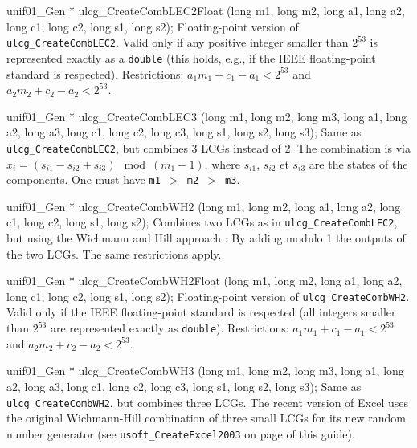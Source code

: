 unif01_Gen * ulcg_CreateCombLEC2Float (long m1, long m2, long a1, long a2,
                                       long c1, long c2, long s1, long s2);
\endcode
  \tab  Floating-point version of {\tt ulcg\_CreateCombLEC2}.
   Valid only if any positive integer smaller than 
   $2^{53}$ is represented exactly as a {\tt double}
   (this holds, e.g., if the IEEE  floating-point standard is respected). 
   Restrictions:  $a_1m_1+c_1 - a_1 < 2^{53}$ and $a_2m_2+c_2 - a_2< 2^{53}$.
  \endtab
\code


unif01_Gen * ulcg_CreateCombLEC3 (long m1, long m2, long m3, long a1,
                                  long a2, long a3, long c1, long c2,
                                  long c3, long s1, long s2, long s3);
\endcode
  \tab  Same as {\tt ulcg\_CreateCombLEC2}, but combines 3 LCGs instead of 2.
   The combination is via
    $x_i = (s_{i1} - s_{i2} + s_{i3}) \mod (m_1-1)$,
   where $s_{i1}$, $s_{i2}$ et $s_{i3}$
   are the states of the components.
   One must have {\tt m1 $>$ m2 $>$ m3}.
  \endtab
\code


unif01_Gen * ulcg_CreateCombWH2 (long m1, long m2, long a1, long a2,
                                 long c1, long c2, long s1, long s2);
\endcode
  \tab  Combines two LCGs as in {\tt ulcg\_CreateCombLEC2}, but using the
   Wichmann and Hill approach \cite {rWIC82a}:
 \label{gen:Wichmann-Hill}%
   By adding modulo 1 the outputs of the two LCGs.
   The same restrictions apply.
  \endtab
\code


unif01_Gen * ulcg_CreateCombWH2Float (long m1, long m2, long a1, long a2,
                                      long c1, long c2, long s1, long s2);
\endcode
  \tab  Floating-point version of {\tt ulcg\_CreateCombWH2}. Valid only if the
   IEEE  floating-point standard is respected (all integers smaller than 
   $ 2^{53}$ are represented exactly as {\tt double}). 
   Restrictions:  $a_1m_1+c_1 - a_1 < 2^{53}$ and $a_2m_2+c_2 - a_2< 2^{53}$.
  \endtab
\code


unif01_Gen * ulcg_CreateCombWH3 (long m1, long m2, long m3, long a1,
                                 long a2, long a3, long c1, long c2,
                                 long c3, long s1, long s2, long s3);
\endcode
  \tab  Same as {\tt ulcg\_CreateCombWH2}, but combines three LCGs.
   The recent version of Excel uses the original Wichmann-Hill combination
   of three small LCGs \cite {rWIC82a} for its new random number
   generator (see \texttt{usoft\_CreateExcel2003}
   on page \pageref{gen:Excel2003} of this guide).
  \endtab


